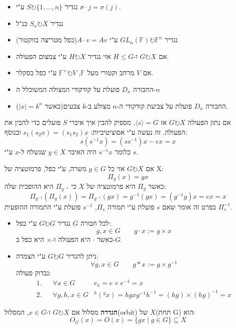 \documentclass{tstextbook}
\begin{document}
\begin{example}[פעולות]
  \begin{itemize}
    \item נגדיר \(S \circlearrowright \{ 1,\dots,n \}\) ע"י \(\sigma\cdot j=\sigma(j)\).
    \item נגדיר \(S_{x}\circlearrowright X\) כנ"ל
    \item נגדיר \(GL_{n}(\mathbb{F})\circlearrowright \mathbb{F}^n\) ע"י \(A\cdot v=Av\)(כפל מטריצה בווקטור)
    \item אם \(G\circlearrowright X\) ו-\(H\leq G\) אזי נגדיר \(H\circlearrowright X\) ע"י צמצום הפעולה.
    \item אם \(V\) מרחב וקטורי מעל \(\mathbb{F}\), \(\mathbb{F}^\times \circlearrowright V\) ע"י כפל בסקלר.
    \item החבורה \(D_{n}\)  פועלת על קודקודי המצולה המשוכלל ה-\(n\)
    \item החבורה \(D_n\) פועלת על צביעת קודקודי ה-\(n\) מצולע ב-\(k\) צבעים(כאשר \(|x|=k^n\)).
  \end{itemize}
\end{example}
\begin{remark}
אם נתון הפעולה \(G\circlearrowright X\) אז \(\langle s\rangle=G\), מספיק להבין איך איברי \(S\) פועלים כדי להבין את הפעולה. 
זה נעשה ע"י אסוציטיביות: \(s_{1}(s_{2}x)=(s_{1}s_{2})x\)  ובנוסף:
$$s(s ^{-1}x)=(ss ^{-1})x-ex=x$$
כלומר \(s ^{-1}x\) היה האיבר \(y\in X\) שנשלח ל-\(x\) ע"י \(s\).

\end{remark}
\begin{remark}
אם \(G\circlearrowright X\) אזי כל \(g\in G\) משרה, ע"י כפל, פרמוטציה של X:
$$\Pi_{g}(x)=gx$$
כאשר \(\Pi_{g}\) היא פרמוטציה של \(X\) כי \(\Pi_{g^{-1}}\) היא ההופכית שלה:
$$\Pi_{g^{-1}}(\Pi_{g}(x))=\Pi_{g^{-1}}(gx)=g^{-1}(gx)=(g^{-1}g)x=ex=x$$
בפרט זה אומר שאם \(s\) פועלת ע"י תמורה \(\Pi_{s}\), \(s ^{-1}\) פועלת ע"י התמורה ההופעית \(\Pi_{s}^{-1}\).

\end{remark}
\begin{example}
  \begin{itemize}
    \item לכל חבורה \(G\) נגדיר \(G\circlearrowright G\) ע"י כפל:
 $$g,x \in G\qquad g\cdot x:=g\times x$$
 כאשר \(\cdot\) היא הפעולה ו-\(\times\) היא כפל ב-\(G\).
    \item ניתן להגדיר \(G\circlearrowright G\)  ע"י הצמדה: 
 $$\forall g,x \in  G \qquad g* x :=g\times g^{-1}$$
נבדוק פעולה:
$$\begin{aligned}1.&  &\forall x \in G &  e_{x}=e\times e^{-1}=x \\2.& &\forall g,h,x \in  G &  ^h(^yx)=hgx g^{-1}h^{-1}=(hg)\times (hg)^{-1}=x
\end{aligned}$$
  \end{itemize}
\end{example}
\textbf{הגדרה} מסלול
אם \(G\circlearrowright X\) ו-\(x \in G\), המסלול(orbit) של \(X\)(תחת G) הוא:
$$O_{G}(x)=O(x)=\{ gx \;\big|\; g\in G \} \subseteq X$$
\end{document}
